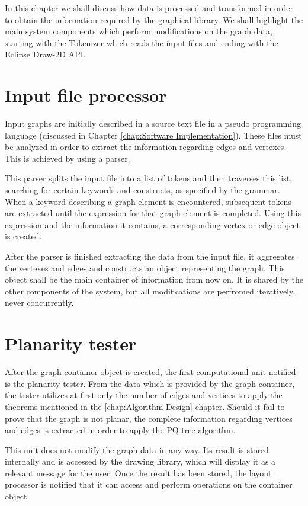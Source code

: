 In this chapter we shall discuss how data is processed and transformed in order to obtain 
the information required by the graphical library. We shall highlight the main system components 
which perform modifications on the graph data, starting with the Tokenizer which reads the input 
files and ending with the Eclipse Draw-2D API.

\section{Input file processor}

Input graphs are initially described in a source text file in a pseudo programming language (discussed in 
Chapter \ref{chap:Software Implementation}). These files must be analyzed in order to extract the information 
regarding edges and vertexes. This is achieved by using a parser.

This parser splits the input file into a list of tokens and then traverses this list, searching for certain 
keywords and constructs, as specified by the grammar. When a keyword describing a graph element is encountered, 
subsequent tokens are extracted until the expression for that graph element is completed. Using this expression 
and the information it contains, a corresponding vertex or edge object is created.

After the parser is finished extracting the data from the input file, it aggregates the vertexes and 
edges and constructs an object representing the graph. This object shall be the main container 
of information from now on. It is shared by the other components of the system, but all modifications are perfromed 
iteratively, never concurrently.

\section{Planarity tester}

After the graph container object is created, the first computational unit notified is the planarity tester. 
From the data which is provided by the graph container, the tester utilizes at first only the number of edges 
and vertices to apply the theorems mentioned in the \ref{chap:Algorithm Design} chapter. Should it fail 
to prove that the graph is not planar, the complete information regarding vertices and edges is extracted 
in order to apply the PQ-tree algorithm.

This unit does not modify the graph data in any way. Its result is stored internally and is accessed by the 
drawing library, which will display it as a relevant message for the user. Once the result has been stored, 
the layout processor is notified that it can access and perform operations on the container object.

